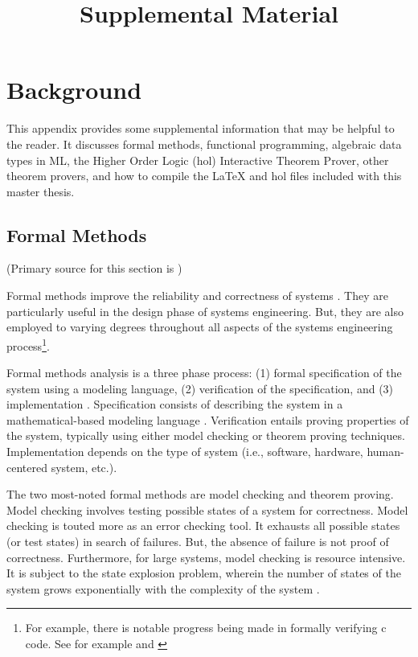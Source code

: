 \documentclass[../../main/main.tex]{subfiles}
\begin{document}
\title{Supplemental Material}

\chapter{Background}\label{chp:background}
This appendix provides some supplemental information that may be helpful to the reader.  It discusses formal methods, functional programming, algebraic data types in ML, the Higher Order Logic (\gls{hol}) Interactive Theorem Prover, other theorem provers, and how to compile the LaTeX and \gls{hol} files included with this master thesis.

\section{Formal Methods}
(Primary source for this section is \cite{formalCarnegie})

Formal methods improve the reliability and correctness of systems \cite{formalmethodslcarke}.  They are particularly useful in the design phase of systems engineering.  But, they are also employed to varying degrees throughout all aspects of the systems engineering process\footnote{For example, there is notable progress being made in formally verifying c code.  See for example \cite{jvmcmv} and \cite{VARVEL}}.  

Formal methods analysis is a three phase process: (1) formal specification of the system using a modeling language, (2) verification of the specification, and (3) implementation \cite{formalCarnegie}.  Specification consists of describing the system in a mathematical-based modeling language \cite{formalCarnegie}.  Verification entails proving properties of the system, typically using either model checking or theorem proving techniques.  Implementation depends on the type of system (i.e., software, hardware, human-centered system, etc.).

The two most-noted formal methods are model checking and theorem proving.  Model checking involves testing possible states of a system for correctness.  Model checking is touted more as an error checking tool.  It exhausts all possible states (or test states) in search of failures.  But, the absence of failure is not proof of correctness.  Furthermore, for large systems, model checking is resource intensive.  It is subject to the state explosion problem, wherein the number of states of the system grows exponentially with the complexity of the system \cite{stateexplosion}. 
\end{document}
